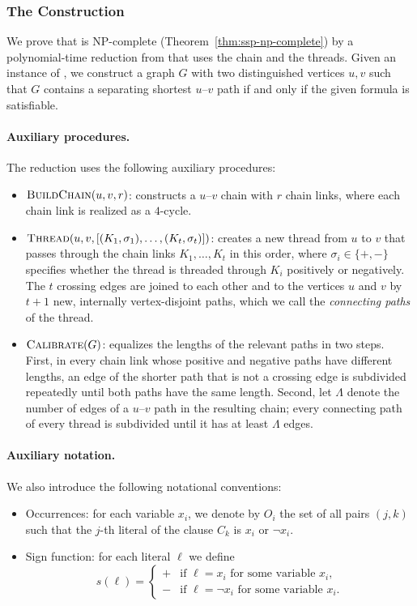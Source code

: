 \subsubsection{The Construction}
\label{sec:reduction-construction}
We prove that \SSP{} is NP-complete (Theorem~\ref{thm:ssp-np-complete}) by a polynomial-time reduction from \ThreeSAT{} that uses the chain and the threads.
Given an instance of \ThreeSAT, we construct a graph $G$ with two distinguished vertices $u,v$ such that $G$ contains a separating shortest $u$--$v$ path if and only if the given formula is satisfiable.

\paragraph{Auxiliary procedures.}
The reduction uses the following auxiliary procedures:
\begin{itemize}
    \item $\textsc{BuildChain}(u,v,r)$: constructs a $u$--$v$ chain with $r$ chain links, where each chain link is realized as a $4$-cycle.
    \item $\textsc{Thread}(u,v,[(K_1,\sigma_1),\dots,(K_t,\sigma_t)])$: creates a new thread from $u$ to $v$ that passes through the chain links $K_1,\dots,K_t$ in this order, where $\sigma_i \in \{+,-\}$ specifies whether the thread is threaded through $K_i$ positively or negatively.
    The $t$ crossing edges are joined to each other and to the vertices $u$ and $v$ by $t+1$ new, internally vertex-disjoint paths, which we call the \emph{connecting paths} of the thread.
    \item $\textsc{Calibrate}(G)$: equalizes the lengths of the relevant paths in two steps.
    First, in every chain link whose positive and negative paths have different lengths, an edge of the shorter path that is not a crossing edge is subdivided repeatedly until both paths have the same length.
    Second, let $\Lambda$ denote the number of edges of a $u$--$v$ path in the resulting chain; every connecting path of every thread is subdivided until it has at least $\Lambda$ edges.
\end{itemize}

\paragraph{Auxiliary notation.}
We also introduce the following notational conventions:
\begin{itemize}
    \item Occurrences: for each variable $x_i$, we denote by $O_i$ the set of all pairs $(j,k)$ such that the $j$-th literal of the clause $C_k$ is $x_i$ or $\neg x_i$.
    \item Sign function: for each literal $\ell$ we define
\[
s(\ell) =
\begin{cases}
+ & \text{if $\ell = x_i$ for some variable $x_i$,}\\
- & \text{if $\ell = \neg x_i$ for some variable $x_i$.}
\end{cases}
\]
\end{itemize}

